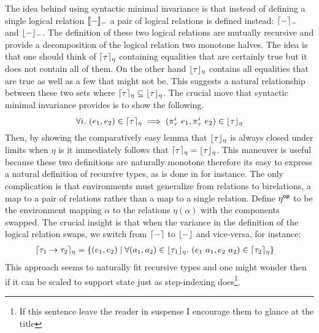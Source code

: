 The idea behind using syntactic minimal invariance is that instead of
defining a single logical relation $\llbracket - \rrbracket_{-}$ a pair of logical
relations is defined instead: $\lceil - \rceil_{-}$ and
$\lfloor - \rfloor_{-}$. The definition of these two logical relations are
mutually recursive and provide a decomposition of the logical relation
two monotone halves. The idea is that one should think of
$\lceil \tau \rceil_{\eta}$ containing equalities that are certainly
true but it does not contain all of them. On the other hand
$\lfloor \tau \rfloor_\eta$ contains all equalities that are true as well
as a few that might not be. This suggests a natural relationship
between these two sets where
$\lceil \tau \rceil_\eta \subseteq \lfloor \tau \rfloor_\eta$. The crucial
move that syntactic minimal invariance provides is to show the
following.
\[
  \forall i.\ (e_1, e_2) \in \lceil \tau \rceil_\eta \implies
  (\pi_\tau^i\ e_1, \pi_\tau^i\ e_2) \in \lfloor \tau \rfloor_\eta
\]
Then, by showing the comparatively easy lemma that
$\lfloor \tau \rfloor_\eta$ is always closed under limits when $\eta$ is it
immediately follows that
$\lceil \tau \rceil_\eta = \lfloor \tau \rfloor_\eta$. This maneuver is
useful because these two definitions are naturally monotone therefore
its easy to express a natural definition of recursive types, as is
done in \citet{TODO-CRARY-HARPER} for instance. The only complication
is that environments must generalize from relations to birelations, a
map to a pair of relations rather than a map to a single
relation. Define $\eta^{\mathsf{op}}$ to be the environment mapping $\alpha$ to
the relations $\eta(\alpha)$ with the components swapped. The crucial
insight is that when the variance in the definition of the logical
relation swaps, we switch from $\lceil - \rceil$ to $\lfloor - \rfloor$ and
vice-versa, for instance:
\begin{align*}
  \lceil \tau_1 \to \tau_2 \rceil_\eta &=
  \{(e_1, e_2) \mid \forall (a_1, a_2) \in \lfloor \tau_1 \rfloor_\eta.
  \ (e_1\ a_1, e_2\ a_2) \in \lceil \tau_2 \rceil_\eta\}
\end{align*}
This approach seems to naturally fit recursive types and one might
wonder then if it can be scaled to support state just as step-indexing
does\footnote{If this sentence leave the reader in suspense I
  encourage them to glance at the title}.

